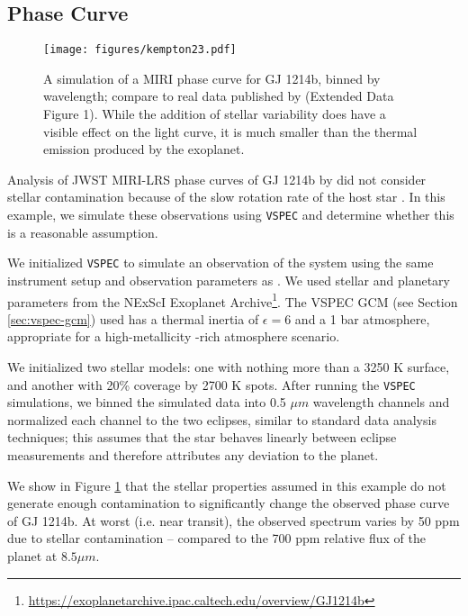 \documentclass[linenumbers,preprint,authoryear]{elsarticle}
\newcommand{\vspec}[1]{\texttt{VSPEC}#1}
\begin{document}
\subsection{Phase Curve}
\begin{figure}[t]
    \centering
    \texttt{[image: figures/kempton23.pdf]}
    \caption{
        A simulation of a MIRI phase curve for GJ 1214b, binned by wavelength; compare to real data published by \citet{kempton2023}(Extended Data Figure 1). While the addition of stellar variability does have a visible effect on the light curve, it is much smaller than the thermal emission produced by the exoplanet.
        }
    \label{fig:gj1214b}
\end{figure}

Analysis of JWST MIRI-LRS phase curves of GJ 1214b by \citet{kempton2023} did not consider stellar contamination because of the slow rotation rate of the host star \citep[approximately 1/80$^{\text{th}}$ the orbital frequency,][]{cloutier2021}. In this example, we simulate these observations using \vspec{} and determine whether this is a reasonable assumption.

We initialized \vspec{} to simulate an observation of the system using the same instrument setup and observation parameters as \citet{kempton2023}. We used stellar and planetary parameters from the NExScI Exoplanet Archive\footnote{\url{https://exoplanetarchive.ipac.caltech.edu/overview/GJ1214b}}. The VSPEC GCM (see Section \ref{sec:vspec-gcm}) used has a thermal inertia of $\epsilon = 6$ and a 1 bar  atmosphere, appropriate for a high-metallicity -rich atmosphere scenario.

We initialized two stellar models: one with nothing more than a 3250 K surface, and another with 20\% coverage by 2700 K spots. After running the \vspec{} simulations, we binned the simulated data into 0.5 $\mu m$ wavelength channels and normalized each channel to the two eclipses, similar to standard data analysis techniques; this assumes that the star behaves linearly between eclipse measurements and therefore attributes any deviation to the planet.

We show in Figure \ref{fig:gj1214b} that the stellar properties assumed in this example do not generate enough contamination to
significantly change the observed phase curve of GJ 1214b. At worst (i.e. near transit), the observed spectrum varies by 50 ppm due to stellar
contamination -- compared to the 700 ppm relative flux of the planet at $8.5 {\mu m}$. 
\end{document}

